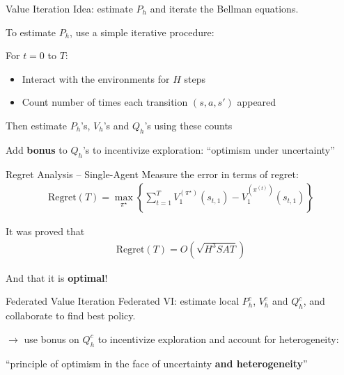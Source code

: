 \documentclass[aspectratio=169,12pt]{beamer}
\begin{document}
\begin{frame}{Value Iteration}
  Idea: estimate $P_h$ and iterate the Bellman equations.

  To estimate $P_h$, use a simple iterative procedure:

  For $t = 0$ to $T$:

  \vspace{-1em}
  
  \begin{itemize}
  \item Interact with the environments for $H$ steps
  \item Count number of times each transition $(s, a, s')$ appeared
  \end{itemize}
  Then estimate $P_h$'s, $V_h$'s and $Q_h$'s using these counts

  Add \textcolor{beamer@blendedblue}{\bfseries bonus} to $Q_h$'s to incentivize exploration: ``optimism under uncertainty''

  \vspace{2em}
\end{frame}

\begin{frame}{Regret Analysis -- Single-Agent}
  Measure the error in terms of regret:
  \begin{align*}
    \label{def:regret}
    \text{Regret}(T)
    =
    \max_{\pi^\star} \left\{ \sum_{t=1}^T 
    V_1^{(\pi^\star)}(s_{t,1}) - V_1^{(\pi^{(t)})}(s_{t,1})
    \right\}
  \end{align*}

  It was proved that
  \begin{align}
    \nonumber
    \text{Regret}(T) = O \left( \sqrt{H^3 S A T }\right)
  \end{align}

  And that it is \textcolor{beamer@blendedblue}{\bfseries optimal}!


\end{frame}


\begin{frame}{Federated Value Iteration}
  Federated VI: estimate local $P_h^c$, $V_h^c$ and $Q_h^c$, and collaborate to find best policy.

  $\rightarrow$ use bonus on $Q_h^c$ to incentivize exploration and account for heterogeneity:

  \qquad \quad ``principle of optimism in the face of uncertainty  \textcolor{beamer@blendedblue}{\bfseries and heterogeneity}''
\end{frame}
\end{document}
